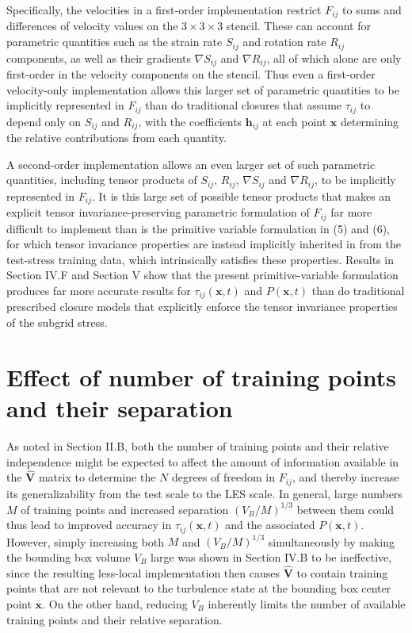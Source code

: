 Specifically, the velocities in a first-order implementation restrict  $F_{ij}$ to sums and differences of velocity values on the $3 \times 3 \times 3$  stencil. These can account for parametric quantities such as the strain rate $S_{ij}$  and rotation rate  $R_{ij}$ components, as well as their gradients $\nabla S_{ij}$  and $\nabla R_{ij}$, all of which alone are only first-order in the velocity components on the stencil. Thus even a first-order velocity-only implementation allows this larger set of parametric quantities to be implicitly represented in $F_{ij}$  than do traditional closures that assume $\tau_{ij}$  to depend only on $S_{ij}$  and $R_{ij}$, with the coefficients $\mathbf{h}_{ij}$  at each point $\mathbf{x}$ determining the relative contributions from each quantity. 

A second-order implementation allows an even larger set of such parametric quantities, including tensor products of $S_{ij}$, $R_{ij}$,  $\nabla S_{ij}$ and $\nabla R_{ij}$, to be implicitly represented in $F_{ij}$. It is this large set of possible tensor products that makes an explicit tensor invariance-preserving parametric formulation of  $F_{ij}$ far more difficult to implement than is the primitive variable formulation in (5) and (6), for which tensor invariance properties are instead implicitly inherited in   from the test-stress training data, which intrinsically satisfies these properties. Results in Section IV.F and Section V show that the present primitive-variable formulation produces far more accurate results for  $\tau_{ij}(\mathbf{x},t)$ and $P(\mathbf{x},t)$  than do traditional prescribed closure models that explicitly enforce the tensor invariance properties of the subgrid stress.

\section{Effect of number of training points and their separation}

As noted in Section II.B, both the number of training points and their relative independence might be expected to affect the amount of information available in the $\widehat{\mathbf{V}}$  matrix to determine the $N$ degrees of freedom in $F_{ij}$, and thereby increase its generalizability from the test scale to the LES scale. In general, large numbers $M$ of training points and increased separation $(V_B/M)^{1/3}$  between them could thus lead to improved accuracy in $\tau_{ij}(\mathbf{x},t)$  and the associated  $P(\mathbf{x},t)$. However, simply increasing both $M$ and $(V_B/M)^{1/3}$  simultaneously by making the bounding box volume  $V_B$ large was shown in Section IV.B to be ineffective, since the resulting less-local implementation then causes $\widehat{\mathbf{V}}$ to contain training points that are not relevant to the turbulence state at the bounding box center point $\mathbf{x}$. On the other hand, reducing  $V_B$ inherently limits the number of available training points and their relative separation. 

